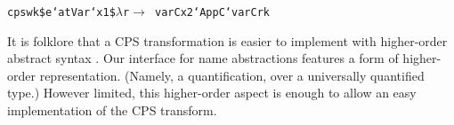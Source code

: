 \documentclass[9pt,authoryear]{sigplanconf}
\begin{document}
{{}\vphantom{$\{$}}\texttt{\mbox{\hspace{0.50em}}}\texttt{\mbox{\hspace{0.50em}}}\texttt{\mbox{\hspace{0.50em}}}\texttt{\mbox{\hspace{0.50em}}}\texttt{\mbox{\hspace{0.50em}}}\texttt{\mbox{\hspace{0.50em}}}\texttt{\mbox{\hspace{0.50em}}}\texttt{cps}\texttt{\mbox{\hspace{0.50em}}}\texttt{\makebox[1.22ex][l]{$ {(} $}}\texttt{wk}\texttt{\mbox{\hspace{0.50em}}}\texttt{\${}}\texttt{\mbox{\hspace{0.50em}}}\texttt{e}\texttt{\mbox{\hspace{0.50em}}}\texttt{{`}atVar{`}}\texttt{\mbox{\hspace{0.50em}}}\texttt{x1}\texttt{\makebox[1.22ex][r]{$ {)} $}}\texttt{\mbox{\hspace{0.50em}}}\texttt{\${}}\texttt{\mbox{\hspace{0.50em}}}\texttt{$ \lambda $}\texttt{r}\texttt{\mbox{\hspace{0.50em}}}\texttt{$ \rightarrow $}\texttt{{\nopagebreak \newline%
}\vphantom{$\{$}}\texttt{\mbox{\hspace{0.50em}}}\texttt{\mbox{\hspace{0.50em}}}\texttt{\mbox{\hspace{0.50em}}}\texttt{\mbox{\hspace{0.50em}}}\texttt{\mbox{\hspace{0.50em}}}\texttt{\mbox{\hspace{0.50em}}}\texttt{\mbox{\hspace{0.50em}}}\texttt{varC}\texttt{\mbox{\hspace{0.50em}}}\texttt{x2}\texttt{\mbox{\hspace{0.50em}}}\texttt{{`}AppC{`}}\texttt{\mbox{\hspace{0.50em}}}\texttt{varC}\texttt{\mbox{\hspace{0.50em}}}\texttt{r}\texttt{\makebox[1.22ex][r]{$ {)} $}}\texttt{\mbox{\hspace{0.50em}}}\texttt{k}\texttt{{\nopagebreak \newline%
}\vphantom{$\{$}}%


%
It is folklore that a CPS transformation is easier
    to implement with higher-order abstract syntax
    \cite{guillemette_type-preserving_2008,washburn_boxes_2003}. Our
    interface for name abstractions features a form of higher-order
    representation. (Namely, a quantification, over a universally
    quantified type.) However limited, this higher-order aspect is
    enough to allow an easy implementation of the CPS transform.%
\end{document}
